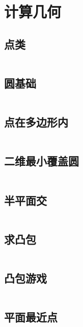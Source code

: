 \chapter{计算几何}
\section{点类}
\inputminted{cpp}{\source/computational-geometry/point.cpp}
\section{圆基础}
\inputminted{cpp}{\source/computational-geometry/circle.cpp}
\section{点在多边形内}
\inputminted{cpp}{\source/computational-geometry/point-in-polygon.cpp}
\section{二维最小覆盖圆}
\inputminted{cpp}{\source/computational-geometry/mincir.cpp}
\section{半平面交}
\inputminted{cpp}{\source/computational-geometry/halfplaneintersection.cpp}
\section{求凸包}
\inputminted{cpp}{\source/computational-geometry/convex-hull.cpp}
\section{凸包游戏}
\inputminted{cpp}{\source/computational-geometry/PlayWithConvex.cpp}
\section{平面最近点}
\inputminted{cpp}{\source/computational-geometry/closest-pair-of-points.cpp}
